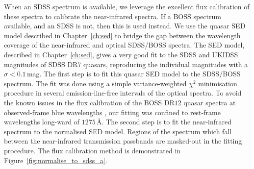 When an SDSS spectrum is available, we leverage the excellent flux calibration of these spectra to calibrate the near-infrared spectra. 
If a BOSS spectrum available, and an SDSS is not, then this is used instead. 
We use the quasar SED model described in Chapter~\ref{ch:sed} to bridge the gap between the wavelength coverage of the near-infrared and optical SDSS/BOSS spectra.
The SED model, described in Chapter~\ref{ch:sed}, gives a very good fit to the SDSS and UKIDSS magnitudes of SDSS DR$7$ quasars, reproducing the individual magnitudes with a $\sigma <0.1$\,mag.
The first step is to fit this quasar SED model to the SDSS/BOSS spectrum. 
The fit was done using a simple variance-weighted $\chi^2$ minimisation procedure in several emission-line-free intervals of the optical spectra.   
To avoid the known issues in the flux calibration of the BOSS DR$12$ quasar spectra at observed-frame blue wavelengths \citep{lee13}, our fitting was confined to rest-frame wavelengths long-ward of $1275$\,\AA. 
The second step is to fit the near-infrared spectrum to the normalised SED model. 
Regions of the spectrum which fall between the near-infrared transmission passbands are masked-out in the fitting procedure. 
The flux calibration method is demonstrated in Figure~\ref{fig:normalise_to_sdss_a}. 

